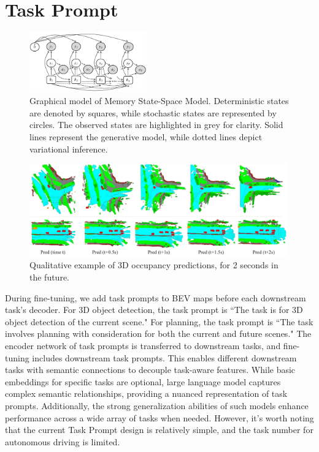 \section{Task Prompt}
\begin{figure}[t]
	\centering
	\includegraphics[width=0.45\textwidth]{figures/graph} 
	\caption{Graphical model of Memory State-Space Model. Deterministic states are denoted by squares, while stochastic states are represented by circles. The observed states are highlighted in grey for clarity. Solid lines represent the generative model, while dotted lines depict variational inference.}
	\label{fig:graph}
\end{figure}
\begin{figure}[t]
	\centering
	\includegraphics[width=0.99\textwidth]{figures/occ} 
	\caption{ Qualitative example of 3D occupancy predictions, for 2 seconds in the future.}
	\label{fig:show}
\end{figure}
During fine-tuning, we add task prompts to BEV maps before each downstream task's decoder. For 3D object detection, the task prompt is ``The task is for 3D object detection of the current scene." For planning, the task prompt is ``The task involves planning with consideration for both the current and future scenes." The encoder network of task prompts is transferred to downstream tasks, and fine-tuning includes downstream task prompts. This enables different downstream tasks with semantic connections to decouple task-aware features. 
While basic embeddings for specific tasks are optional, large language model captures complex semantic relationships, providing a nuanced representation of task prompts. Additionally, the strong generalization abilities of such models enhance performance across a wide array of tasks when needed.
However, it's worth noting that the current Task Prompt design is relatively simple, and the task number for autonomous driving is limited.

